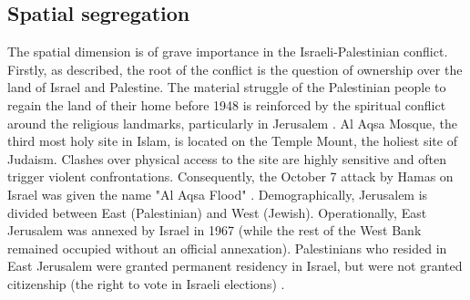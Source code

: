 \documentclass[dissertation,math,vertlayout,pdfa,colorlinks]{aaltoseries}
\begin{document}
\subsection{Spatial segregation}
The spatial dimension is of grave importance in the Israeli-Palestinian conflict. Firstly, as described, the root of the conflict is the question of ownership over the land of Israel and Palestine. The material struggle of the Palestinian people to regain the land of their home before 1948 is reinforced by the spiritual conflict around the religious landmarks, particularly in Jerusalem \cite{kleinJerusalem2022}. Al Aqsa Mosque, the third most holy site in Islam, is located on the Temple Mount, the holiest site of Judaism. Clashes over physical access to the site are highly sensitive and often trigger violent confrontations. Consequently, the October 7 attack by Hamas on Israel was given the name "Al Aqsa Flood" \cite{tarasiukGeostrategicImportanceTemple2023}. Demographically, Jerusalem is divided between East (Palestinian) and West (Jewish). Operationally, East Jerusalem was annexed by Israel in 1967 (while the rest of the West Bank remained occupied without an official annexation). Palestinians who resided in East Jerusalem were granted permanent residency in Israel, but were not granted citizenship (the right to vote in Israeli elections) \cite{kleinJerusalem2022}. 
\end{document}

